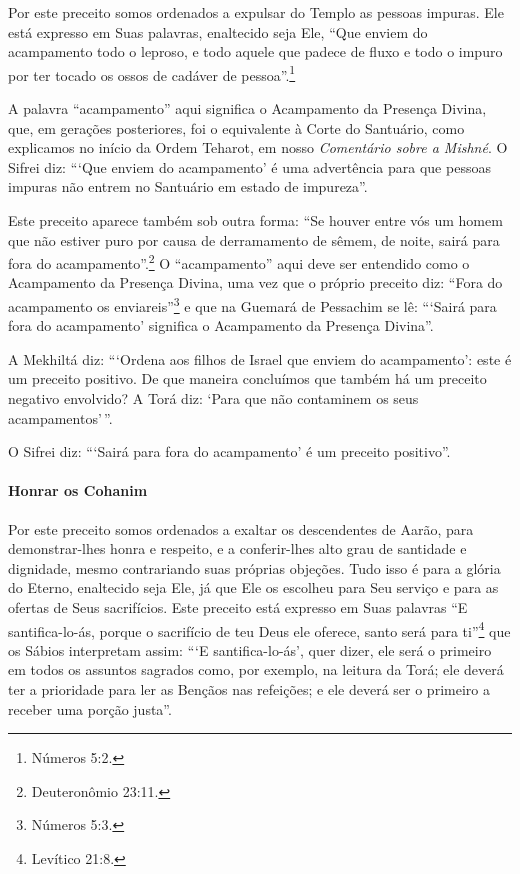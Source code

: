 Por este preceito somos ordenados a expulsar do Templo as pessoas
impuras. Ele está expresso em Suas palavras, enaltecido seja Ele, ``Que
enviem do acampamento todo o leproso, e todo aquele que padece de fluxo
e todo o impuro por ter tocado os ossos de cadáver de pessoa''.\footnote{Números
5:2.}

A palavra ``acampamento'' aqui significa o Acampamento da Presença
Divina, que, em gerações posteriores, foi o equivalente à Corte do
Santuário, como explicamos no início da Ordem Teharot, em nosso
\emph{Comentário sobre a Mishné}. O Sifrei diz: ```Que enviem do acampamento'
é uma advertência para que pessoas impuras não entrem no Santuário em
estado de impureza''.

Este preceito aparece também sob outra forma: ``Se houver entre vós
um homem que não estiver puro por causa de derramamento de sêmem, de
noite, sairá para fora do acampamento''.\footnote{Deuteronômio 23:11.} O
``acampamento'' aqui deve ser entendido como o Acampamento da Presença
Divina, uma vez que o próprio preceito diz: ``Fora do acampamento os
enviareis''\footnote{Números 5:3.} e que na Guemará de Pessachim se lê: ```Sairá
para fora do acampamento' significa o Acampamento da Presença Divina''.

A Mekhiltá diz: ```Ordena aos filhos de Israel que enviem do
acampamento': este é um preceito positivo. De que maneira concluímos que
também há um preceito negativo envolvido? A Torá diz: `Para que não
contaminem os seus acampamentos'\,''.

O Sifrei diz: ```Sairá para fora do acampamento' é um preceito positivo''.

\paragraph{Honrar os Cohanim}

Por este preceito somos ordenados a exaltar os descendentes de Aarão,
para demonstrar-lhes honra e respeito, e a conferir-lhes alto grau de
santidade e dignidade, mesmo contrariando suas próprias objeções. Tudo
isso é para a glória do Eterno, enaltecido seja Ele, já que Ele os
escolheu para Seu serviço e para as ofertas de Seus sacrifícios. Este
preceito está expresso em Suas palavras ``E santifica-lo-ás, porque o
sacrifício de teu Deus ele oferece, santo será para ti''\footnote{Levítico 21:8.}
que os Sábios interpretam assim: ```E santifica-lo-ás', quer dizer, ele
será o primeiro em todos os assuntos sagrados como, por exemplo, na
leitura da Torá; ele deverá ter a prioridade para ler as Bençãos nas
refeições; e ele deverá ser o primeiro a receber uma porção justa''.

